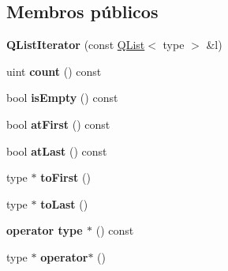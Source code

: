 \subsection*{Membros públicos}
\begin{DoxyCompactItemize}
\item 
\hypertarget{class_q_list_iterator_a92524666f70e94a2108d3ddb0aaf06e5}{{\bfseries Q\-List\-Iterator} (const \hyperlink{class_q_list}{Q\-List}$<$ type $>$ \&l)}\label{class_q_list_iterator_a92524666f70e94a2108d3ddb0aaf06e5}

\item 
\hypertarget{class_q_list_iterator_a774149fc271ebaba2aabcd183a836e8f}{uint {\bfseries count} () const }\label{class_q_list_iterator_a774149fc271ebaba2aabcd183a836e8f}

\item 
\hypertarget{class_q_list_iterator_a479432127ee77145cc19d6a2d1590821}{bool {\bfseries is\-Empty} () const }\label{class_q_list_iterator_a479432127ee77145cc19d6a2d1590821}

\item 
\hypertarget{class_q_list_iterator_a31ccd7308e8fa3fa71c847fec15eceb3}{bool {\bfseries at\-First} () const }\label{class_q_list_iterator_a31ccd7308e8fa3fa71c847fec15eceb3}

\item 
\hypertarget{class_q_list_iterator_aa158c7c7d48ef7ab1e349457aa795878}{bool {\bfseries at\-Last} () const }\label{class_q_list_iterator_aa158c7c7d48ef7ab1e349457aa795878}

\item 
\hypertarget{class_q_list_iterator_a7e3cadfe5d178fc4db2e97112af20024}{type $\ast$ {\bfseries to\-First} ()}\label{class_q_list_iterator_a7e3cadfe5d178fc4db2e97112af20024}

\item 
\hypertarget{class_q_list_iterator_ae427337160afaa9645615a818663af55}{type $\ast$ {\bfseries to\-Last} ()}\label{class_q_list_iterator_ae427337160afaa9645615a818663af55}

\item 
\hypertarget{class_q_list_iterator_a2e144510e7eb044f9d96660f6590a589}{{\bfseries operator type $\ast$} () const }\label{class_q_list_iterator_a2e144510e7eb044f9d96660f6590a589}

\item 
\hypertarget{class_q_list_iterator_aca55175e0bebef0421c689d5af0f4cba}{type $\ast$ {\bfseries operator$\ast$} ()}\label{class_q_list_iterator_aca55175e0bebef0421c689d5af0f4cba}


\end{DoxyCompactItemize}

